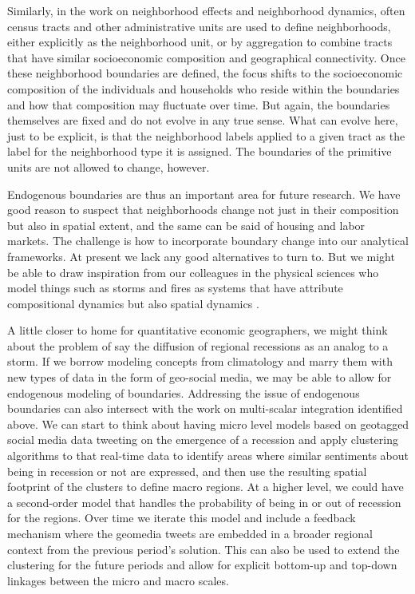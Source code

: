 \documentclass[11pt]{article}
\begin{document}
Similarly, in the work on neighborhood effects and neighborhood dynamics, often
census tracts and other administrative units are used to define neighborhoods,
either explicitly as the neighborhood unit, or by aggregation to combine tracts
that have similar socioeconomic composition and geographical connectivity.
Once these neighborhood boundaries are defined, the focus shifts to the
socioeconomic composition of the individuals and households who reside within
the boundaries and how that composition may fluctuate over time. But again, the
boundaries themselves are fixed and do not evolve in any true sense. What can
evolve here, just to be explicit, is that the neighborhood labels applied to a
given tract as the label for the neighborhood type it is assigned. The
boundaries of the primitive units are not allowed to change, however.

Endogenous boundaries are thus an important area for future research. We have
good reason to suspect that neighborhoods change not just in their
composition but also in spatial extent, and the same can be said of housing and
labor markets. The challenge is how to incorporate boundary change into our
analytical frameworks. At present we lack any good alternatives to turn to. But
we might be able to draw inspiration from our colleagues in the physical
sciences who model things such as storms and fires as systems that have 
attribute compositional dynamics but also spatial dynamics \cite{yuan2001representing}. 

A little closer to home for quantitative economic geographers, we might think
about the problem of say the diffusion of regional recessions as an analog to a
storm. If we borrow modeling concepts from climatology and marry them with new
types of data in the form of geo-social media, we may be able to allow for
endogenous modeling of boundaries. Addressing the issue of endogenous
boundaries can also intersect with the work on multi-scalar integration
identified above. We can start to think about having micro level models based 
on geotagged social media data tweeting on the emergence of a recession and
apply clustering algorithms to that real-time data to identify areas where 
similar sentiments about being in recession or not are expressed, and then use
the resulting spatial footprint of the clusters to define macro regions. At a
higher level, we could have a second-order model that handles the
probability of being in or out of recession for the regions. Over time we
iterate this model and include a feedback mechanism where the geomedia tweets
are embedded in a broader regional context from the previous period's solution.
This can also be used to extend the clustering for the future periods and allow
for explicit bottom-up and top-down linkages between the micro and macro scales.
\end{document}
